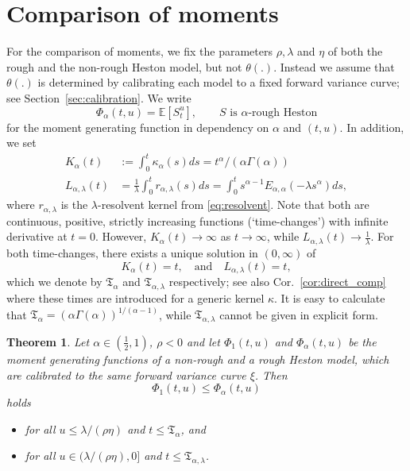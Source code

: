 \documentclass[12pt,a4paper]{amsart}
\numberwithin{equation}{section}
\numberwithin{equation}{section}
\newtheorem{theorem}{Theorem}[section]
\theoremstyle{nonumberplain}
\newcommand{\E}[1]{\mathbb{E}\left[#1\right]}                     %
\begin{document}
\section{Comparison of moments}
For the comparison of moments, we fix the parameters $\rho, \lambda$ and $\eta$ of both the rough and the non-rough Heston model, but not $\theta(.)$. Instead we assume that $\theta(.)$ is determined by calibrating each model to a fixed forward variance curve; see Section~\ref{sec:calibration}. We write 
\[\Phi_\alpha(t,u) = \E{S_t^u}, \qquad \text{$S$ is $\alpha$-rough Heston}\]
for the moment generating function in dependency on $\alpha$ and $(t,u)$. In addition, we set
\begin{equation}\label{eq:KL}
\begin{split}
K_\alpha(t) &:= \int_0^t \kappa_\alpha(s) ds = t^\alpha / (\alpha \Gamma(\alpha))\\
L_{\alpha,\lambda}(t) &= \frac{1}{\lambda} \int_0^t r_{\alpha,\lambda}(s) ds =  \int_0^t s^{\alpha- 1} E_{\alpha,\alpha}(-\lambda s^\alpha) ds,
\end{split}
\end{equation}
where $r_{\alpha,\lambda}$ is the $\lambda$-resolvent kernel from \eqref{eq:resolvent}. Note that both are continuous, positive, strictly increasing functions (`time-changes') with infinite derivative at $t= 0$. However, $K_\alpha(t) \to \infty$ as $t \to \infty$, while $L_{\alpha,\lambda}(t) \to \tfrac{1}{\lambda}$. For both time-changes, there exists a unique solution in $(0,\infty)$ of
\[K_\alpha(t) = t, \quad \text{and} \quad L_{\alpha,\lambda}(t) = t,\]
which we denote by $\mathfrak{T}_\alpha$ and $\mathfrak{T}_{\alpha,\lambda}$ respectively; see also Cor.~\ref{cor:direct_comp} where these times are introduced for a generic kernel $\kappa$. It is easy to calculate that $\mathfrak{T}_\alpha = (\alpha \Gamma(\alpha))^{1/(\alpha-1)}$, while $\mathfrak{T}_{\alpha,\lambda}$ cannot be given in explicit form.



\begin{theorem}\label{thm:mgf_comparison}
Let $\alpha \in (\tfrac{1}{2},1)$, $\rho < 0$ and let $\Phi_1(t,u)$ and $\Phi_\alpha(t,u)$ be the moment generating functions of a non-rough and a rough Heston model, which are calibrated to the same forward variance curve $\xi$. Then 
\[\Phi_1(t,u) \le \Phi_\alpha(t,u)\]
holds 
\begin{itemize}
\item[(a)] for all $u \le \lambda/(\rho \eta)$ and $t \le \mathfrak{T}_\alpha$, and
\item[(b)] for all $u \in (\lambda/(\rho \eta), 0]$ and $t \le \mathfrak{T}_{\alpha,\lambda}$.
\end{itemize}
\end{theorem}
\end{document}
